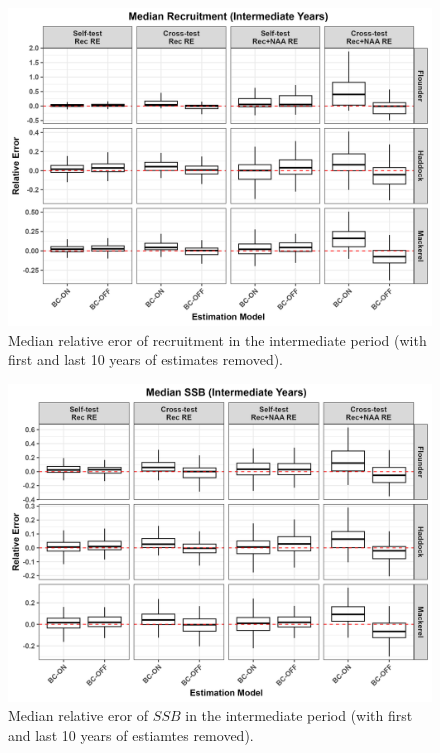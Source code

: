 \documentclass[
  12pt,
]{article}
\begin{document}
\begin{figure}[H]
\centering
\includegraphics[width=\textwidth]{Revised_Figures&Tables/Rec_intermediate.PNG}
\caption{Median relative eror of recruitment in the intermediate period (with first and last 10 years of estimates removed).}
\label{fig:supp_Rec_intermediate}
\end{figure}

\begin{figure}[H]
\centering
\includegraphics[width=\textwidth]{Revised_Figures&Tables/SSB_intermediate.PNG}
\caption{Median relative eror of $SSB$ in the intermediate period (with first and last 10 years of estiamtes removed).}
\label{fig:supp_SSB_intermediate}
\end{figure}

\renewcommand{\thefigure}{\arabic{figure}}

\pagebreak



\pagebreak
\end{document}
